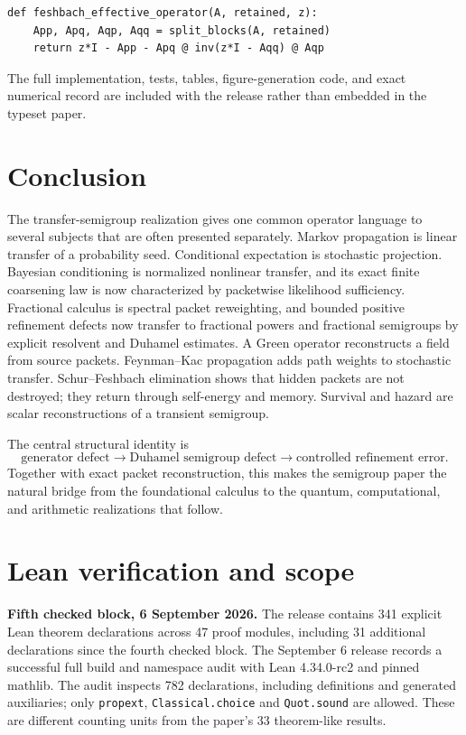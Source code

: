 \documentclass[11pt,letterpaper]{article}
\theoremstyle{plain}
\theoremstyle{plain}
\theoremstyle{plain}
\theoremstyle{definition}
\theoremstyle{definition}
\theoremstyle{definition}
\theoremstyle{definition}
\theoremstyle{definition}
\theoremstyle{remark}
\theoremstyle{remark}
\theoremstyle{remark}
\theoremstyle{remark}
\theoremstyle{remark}
\theoremstyle{remark}
\begin{document}
\begin{lstlisting}[caption={Finite Schur-Feshbach effective operator.}]
def feshbach_effective_operator(A, retained, z):
    App, Apq, Aqp, Aqq = split_blocks(A, retained)
    return z*I - App - Apq @ inv(z*I - Aqq) @ Aqp
\end{lstlisting}

The full implementation, tests, tables, figure-generation code, and exact numerical record are included with the release rather than embedded in the typeset paper.

\FloatBarrier
\section{Conclusion}\label{core:section:19}

The transfer-semigroup realization gives one common operator language to several subjects that are often presented separately. Markov propagation is linear transfer of a probability seed. Conditional expectation is stochastic projection. Bayesian conditioning is normalized nonlinear transfer, and its exact finite coarsening law is now characterized by packetwise likelihood sufficiency. Fractional calculus is spectral packet reweighting, and bounded positive refinement defects now transfer to fractional powers and fractional semigroups by explicit resolvent and Duhamel estimates. A Green operator reconstructs a field from source packets. Feynman--Kac propagation adds path weights to stochastic transfer. Schur--Feshbach elimination shows that hidden packets are not destroyed; they return through self-energy and memory. Survival and hazard are scalar reconstructions of a transient semigroup.

The central structural identity is
\[
\boxed{
\text{generator defect}
\longrightarrow
\text{Duhamel semigroup defect}
\longrightarrow
\text{controlled refinement error}.
}
\]
Together with exact packet reconstruction, this makes the semigroup paper the natural bridge from the foundational calculus to the quantum, computational, and arithmetic realizations that follow.

\clearpage
\appendix
\FloatBarrier
\section{Lean verification and scope}\label{core:section:20}\label{core:sec:lean-status}
\noindent\textbf{Fifth checked block, 6 September 2026.}
The release contains 341 explicit Lean theorem declarations across 47 proof modules,
including 31 additional declarations since the fourth checked block. The September 6 release records a successful full
build and namespace audit with Lean 4.34.0-rc2 and pinned mathlib. The audit
inspects 782 declarations, including definitions and generated auxiliaries; only
\texttt{propext}, \texttt{Classical.choice} and \texttt{Quot.sound} are allowed.
These are different counting units from the paper's 33 theorem-like results.
\end{document}
